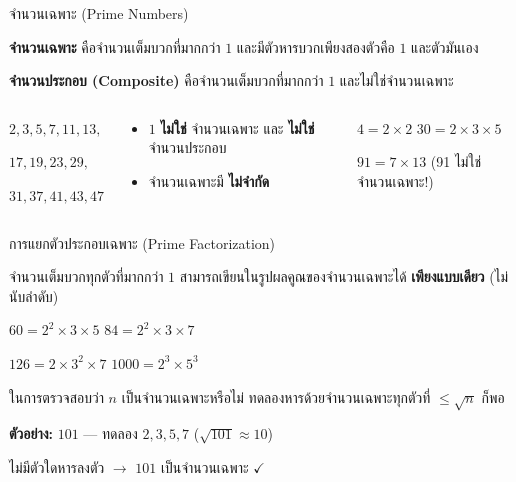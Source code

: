 \documentclass[11pt, aspectratio=169]{beamer}
\begin{document}
\begin{frame}{จำนวนเฉพาะ (Prime Numbers)}
  \begin{explanation}[นิยาม]
    \textbf{จำนวนเฉพาะ} คือจำนวนเต็มบวกที่มากกว่า $1$ และมีตัวหารบวกเพียงสองตัวคือ $1$ และตัวมันเอง

    \textbf{จำนวนประกอบ (Composite)} คือจำนวนเต็มบวกที่มากกว่า $1$ และไม่ใช่จำนวนเฉพาะ
  \end{explanation}

  \begin{columns}[T]
      \begin{exambox}[จำนวนเฉพาะ $< 50$]
        $2, 3, 5, 7, 11, 13,$

        $17, 19, 23, 29,$

        $31, 37, 41, 43, 47$

        \medskip
      \end{exambox}
      \begin{explanation}[หมายเหตุ]
        \begin{itemize}
          \item $1$ \textbf{ไม่ใช่} จำนวนเฉพาะ และ \textbf{ไม่ใช่} จำนวนประกอบ
          \item จำนวนเฉพาะมี \textbf{ไม่จำกัด}
        \end{itemize}
      \end{explanation}

      \begin{exambox}
        $4 = 2 \times 2$ \qquad $30 = 2 \times 3 \times 5$

        $91 = 7 \times 13$ \quad (91 ไม่ใช่จำนวนเฉพาะ!)
      \end{exambox}
  \end{columns}
\end{frame}

\begin{frame}{การแยกตัวประกอบเฉพาะ (Prime Factorization)}
  \begin{explanation}
    จำนวนเต็มบวกทุกตัวที่มากกว่า $1$ สามารถเขียนในรูปผลคูณของจำนวนเฉพาะได้
    \textbf{เพียงแบบเดียว} (ไม่นับลำดับ)
  \end{explanation}

  \begin{exambox}[ตัวอย่าง]
    $60 = 2^2 \times 3 \times 5$ \qquad $84 = 2^2 \times 3 \times 7$

    $126 = 2 \times 3^2 \times 7$ \qquad $1000 = 2^3 \times 5^3$
  \end{exambox}

  \begin{exambox}
    ในการตรวจสอบว่า $n$ เป็นจำนวนเฉพาะหรือไม่
    ทดลองหารด้วยจำนวนเฉพาะทุกตัวที่ $\leq \sqrt{n}$ ก็พอ

    \textbf{ตัวอย่าง:} $101$ — ทดลอง $2, 3, 5, 7$ ($\sqrt{101} \approx 10$)

    ไม่มีตัวใดหารลงตัว $\rightarrow$ $101$ เป็นจำนวนเฉพาะ $\checkmark$
  \end{exambox}
\end{frame}
\end{document}
